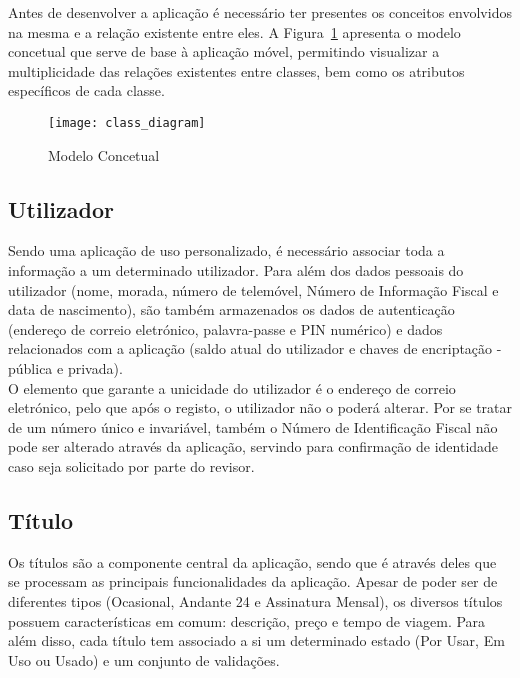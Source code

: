 Antes de desenvolver a aplicação é necessário ter presentes os conceitos envolvidos na mesma e a relação existente entre eles. A Figura~\ref{fig:class_diagram} apresenta o modelo concetual que serve de base à aplicação móvel, permitindo visualizar a multiplicidade das relações existentes entre classes, bem como os atributos específicos de cada classe.

\begin{figure}[t]
  \begin{center}
    \leavevmode
    \texttt{[image: class\_diagram]}
    \caption{Modelo Concetual}
    \label{fig:class_diagram}
  \end{center}
\end{figure}

\subsection{Utilizador}

Sendo uma aplicação de uso personalizado, é necessário associar toda a informação a um determinado utilizador. Para além dos dados pessoais do utilizador (nome, morada, número de telemóvel, Número de Informação Fiscal e data de nascimento), são também armazenados os dados de autenticação (endereço de correio eletrónico, palavra-passe e PIN numérico) e dados relacionados com a aplicação (saldo atual do utilizador e chaves de encriptação - pública e privada).
\\O elemento que garante a unicidade do utilizador é o endereço de correio eletrónico, pelo que após o registo, o utilizador não o poderá alterar. Por se tratar de um número único e invariável, também o Número de Identificação Fiscal não pode ser alterado através da aplicação, servindo para confirmação de identidade caso seja solicitado por parte do revisor.

\subsection{Título}

Os títulos são a componente central da aplicação, sendo que é através deles que se processam as principais funcionalidades da aplicação. Apesar de poder ser de diferentes tipos (Ocasional, Andante 24 e Assinatura Mensal), os diversos títulos possuem características em comum: descrição, preço e tempo de viagem. Para além disso, cada título tem associado a si um determinado estado (Por Usar, Em Uso ou Usado) e um conjunto de validações.


